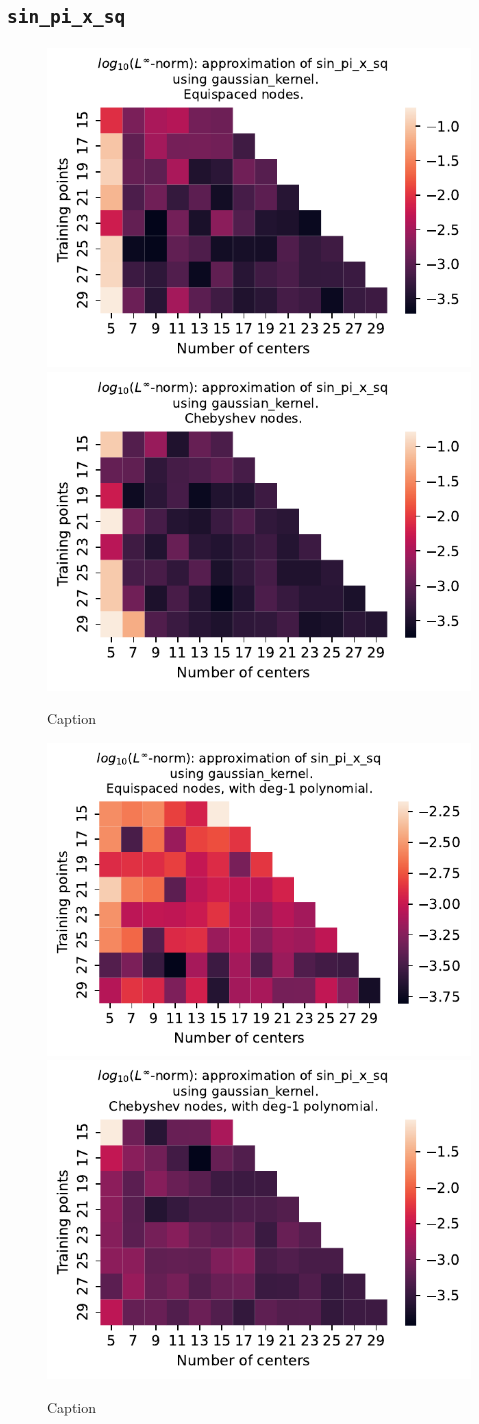 \documentclass[12pt]{report} %
\begin{document}
\subsection*{\texttt{sin\_pi\_x\_sq}}

\begin{figure}[ht]
  \centering

  \includegraphics[width=.49\textwidth]{imagenes/experiments/1d/variational/sin_pi_x_sq-Kgaussian_kernel-Equi.pdf}
  \includegraphics[width=.49\textwidth]{imagenes/experiments/1d/variational/sin_pi_x_sq-Kgaussian_kernel-Cheb.pdf}
  \caption{Caption}
  \label{fig:sin-pi-x-sq-gaussian}
\end{figure}

\begin{figure}[ht]
  \centering

  \includegraphics[width=.49\textwidth]{imagenes/experiments/1d/variational/sin_pi_x_sq-Kgaussian_kernel-Poly-Equi.pdf}
  \includegraphics[width=.49\textwidth]{imagenes/experiments/1d/variational/sin_pi_x_sq-Kgaussian_kernel-Poly-Cheb.pdf}
  \caption{Caption}
  \label{fig:sin-pi-x-sq-gaussian-poly}
\end{figure}
\end{document}
